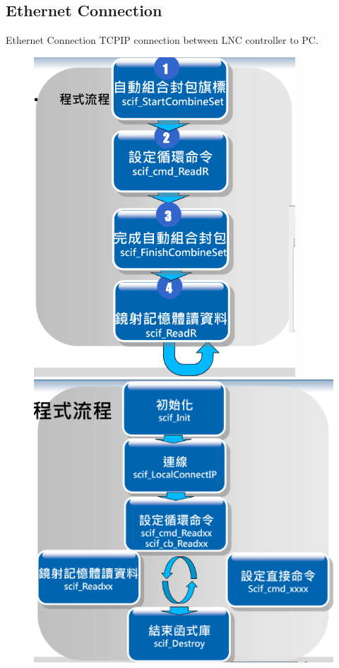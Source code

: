 \documentclass[11pt]{beamer}
\begin{document}
\subsection{Ethernet Connection}
\begin{frame}{Ethernet Connection}
TCPIP connection between LNC controller to PC.
\begin{figure}
  \centering
  \includegraphics[scale=0.3]{controller.png}
  \includegraphics[scale=0.3]{controller2.png}
\end{figure}
\end{frame}
\end{document}
